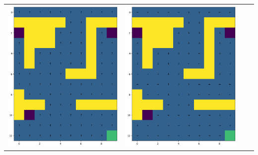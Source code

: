 \documentclass[12pt,a4paper]{report}
\begin{document}
\begin{landscape}
\begin{center}
\begin{tabular}{c || c  c  c}
            \includegraphics[width=0.35\textheight]{assets/dp/analysis/prob_0.25_gamma_0.8_policy.png}
        &
            \includegraphics[width=0.35\textheight]{assets/dp/analysis/prob_0.5_gamma_0.8_policy.png}

\end{tabular}
\end{center}
\end{landscape}
\end{document}

